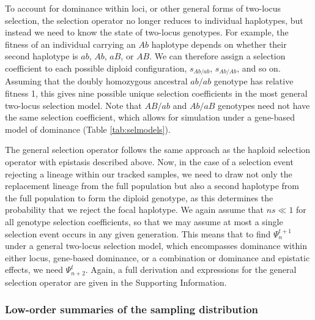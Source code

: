 \documentclass[]{article}
\begin{document}
To account for dominance within loci, or other general forms of two-locus
selection, the selection operator no longer reduces to individual haplotypes,
but instead we need to know the state of two-locus genotypes. For example, the
fitness of an individual carrying an \(Ab\) haplotype depends on whether their
second haplotype is \(ab\), \(Ab\), \(aB\), or \(AB\). We can therefore assign
a selection coefficient to each possible diploid configuration, \(s_{Ab/ab}\),
\(s_{Ab/Ab}\), and so on. Assuming that the doubly homozygous ancestral
\(ab/ab\) genotype has relative fitness 1, this gives nine possible unique
selection coefficients in the most general two-locus selection model. Note that
\(AB/ab\) and \(Ab/aB\) genotypes need not have the same selection coefficient,
which allows for simulation under a gene-based model of dominance (Table
\ref{tab:selmodels}).

The general selection operator follows the same approach as the haploid
selection operator with epistasis described above. Now, in the case of a
selection event rejecting a lineage within our tracked samples, we need to draw
not only the replacement lineage from the full population but also a second
haplotype from the full population to form the diploid genotype, as this
determines the probability that we reject the focal haplotype. We again assume
that \(ns \ll 1\) for all genotype selection coefficients, so that we may
assume at most a single selection event occurs in any given generation. This
means that to find \(\Psi_n^{t+1}\) under a general two-locus selection model,
which encompasses dominance within either locus, gene-based dominance, or a
combination or dominance and epistatic effects, we need \(\Psi_{n+2}^t\).
Again, a full derivation and expressions for the general selection operator are
given in the Supporting Information.

\subsubsection{Low-order summaries of the sampling distribution}
\end{document}
